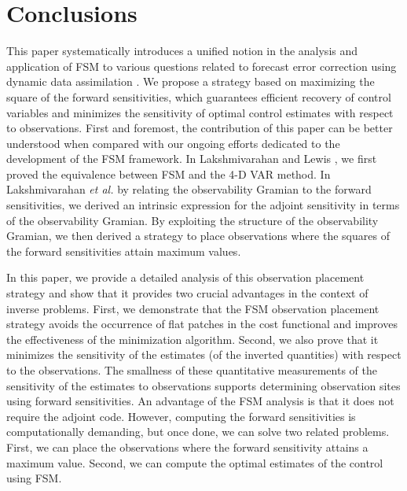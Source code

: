 \documentclass{article}
\begin{document}
\section{Conclusions} \label{sec:conc}
This paper systematically introduces a unified notion in the analysis and application of FSM to various questions related to forecast error correction using dynamic data assimilation \cite{lakshmivarahan2017forecast}. \textcolor{rev}{We propose a strategy based on maximizing the square of the forward sensitivities, which guarantees efficient recovery of control variables and minimizes the sensitivity of optimal control estimates with respect to observations.} First and foremost, the contribution of this paper can be better understood when compared with our ongoing efforts dedicated to the development of the FSM framework.  
In Lakshmivarahan and Lewis \cite{lakshmivarahan2010forward}, we first proved the equivalence between FSM and the 4-D VAR method. In Lakshmivarahan \emph{et al.} \cite{lakshmivarahan2020controlling,lakshmivarahan2022observability} by relating the observability Gramian to the forward sensitivities, we derived an intrinsic expression for the adjoint sensitivity in terms of the observability Gramian. By exploiting the structure of the observability Gramian, we then derived a strategy to place observations where the squares of the forward sensitivities attain maximum values. 

\textcolor{rev}{In this paper, we provide a detailed analysis of this observation placement strategy and show that it provides two crucial advantages in the context of inverse problems. First, we demonstrate that the FSM observation placement strategy avoids the occurrence of flat patches in the cost functional and improves the effectiveness of the minimization algorithm. Second, we also prove that it minimizes the sensitivity of the estimates (of the inverted quantities) with respect to the observations.} The smallness of these quantitative measurements of the sensitivity of the estimates to observations supports  determining observation sites using forward sensitivities. An advantage of the FSM analysis is that it does not require the adjoint code. However, computing the forward sensitivities is computationally demanding, but once done, we can solve two related problems. First, we can place the observations where the forward sensitivity attains a maximum value. Second, we can compute the optimal estimates of the control using FSM.
\end{document}

